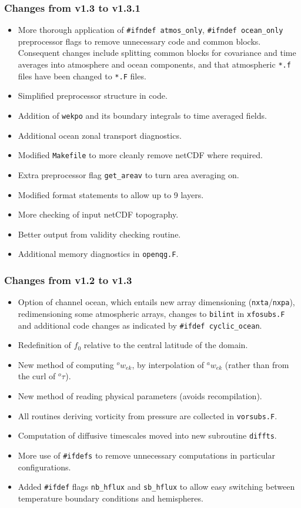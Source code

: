 \documentclass[11pt, a4paper,twoside]{article}
\newcommand{\ek}[1]{{{}^{#1}w_{ek}}}
\newcommand{\tx}[2]{{}^{#1}\tau^{#2}}
\numberwithin{equation}{section}
\begin{document}
\subsubsection{Changes from v1.3 to v1.3.1}
\begin{itemize}
  \item More thorough application of \verb=#ifndef atmos_only=, \verb=#ifndef ocean_only= preprocessor flags to remove unnecessary code and common blocks.   Consequent changes include splitting common blocks for covariance and time averages into atmosphere and ocean components, and that atmospheric \verb=*.f= files have been changed to \verb=*.F= files.
\item Simplified preprocessor structure in code.
\item Addition of \verb=wekpo= and its boundary integrals to time averaged fields.
\item Additional ocean zonal transport diagnostics.
\item Modified \verb=Makefile= to more cleanly remove netCDF where required.
\item Extra preprocessor flag \verb=get_areav= to turn area averaging on.
\item Modified format statements to allow up to 9 layers.
\item More checking of input netCDF topography.
\item Better output from validity checking routine.
\item Additional memory diagnostics in \verb=openqg.F=.
\end{itemize}
  
\subsubsection{Changes from v1.2 to v1.3}
\begin{itemize}
  \item Option of channel ocean, which entails new array dimensioning (\verb=nxta=/\verb=nxpa=), redimensioning some atmospheric arrays, changes to \verb=bilint= in \verb=xfosubs.F= and additional code changes as indicated by \verb=#ifdef cyclic_ocean=.
  \item Redefinition of $f_0$ relative to the central latitude of the domain.
  \item New method of computing $\ek{o}$, by interpolation of $\ek{a}$ (rather than from the curl of $\tx{o}{}$).
  \item New method of reading physical parameters (avoids recompilation).
  \item All routines deriving vorticity from pressure are collected in \verb=vorsubs.F=.
  \item Computation of diffusive timescales moved into new subroutine \verb=diffts=.
  \item More use of \verb=#ifdefs= to remove unnecessary computations in particular configurations.
  \item Added \verb=#ifdef= flags \verb=nb_hflux= and   \verb=sb_hflux= to allow easy switching between temperature boundary conditions and hemispheres.
\end{itemize}
\end{document}
